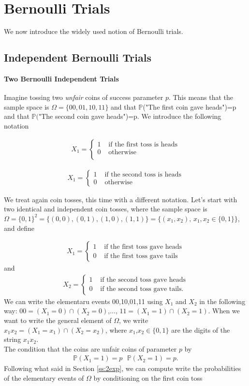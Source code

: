 \documentclass[12pt]{article}
\newcommand{\<}{{\langle \!\! \langle}}
\renewcommand{\>}{{\rangle \!\! \rangle}}
\newcommand{\bel}[2]{\begin{equation} \label{#1} \begin{split} #2
 					\end{split} \end{equation}}
\begin{document}
\section{ Bernoulli Trials} \label{s:bernoulli}

We now introduce the widely used notion of Bernoulli trials. 

\subsection{Independent Bernoulli Trials}

\paragraph{Two Bernoulli Independent Trials} 
Imagine tossing two \emph{unfair} coins of success parameter $p$. This means that the sample space is $\Omega = \{00,01,10,11\}$ and that $\mathbb{P}$("The first coin gave heads")=p and that $\mathbb{P}($"The second coin gave heads")=p. We introduce the following notation


\bel{d:x1}{
		 X_1 = \begin{cases}
			 1 &  \textrm{ if the first toss is heads}\\
		 	0 & \textrm{ otherwise }\\
		 \end{cases}}

	 \bel{d:x2}{
		 X_1 = \begin{cases}
			 1 &  \textrm{ if the second toss is heads}\\
		 	0 & \textrm{ otherwise }
		 \end{cases}}


We treat again coin tosses, this time with a different notation. Let's start with two identical and independent coin tosses, where the sample space is $\Omega=\{0,1\}^2=\{(0,0),(0,1),(1,0),(1,1)\}=\{(x_1,x_2), \,x_1,x_2\in\{0,1\}\}$, and define  


\bel{}{X_1=\begin{cases}
1 & \textrm{ if the first toss gave heads}\\
0 & \textrm{ if the first toss gave tails}
\end{cases}}
and
\bel{}{X_2=\begin{cases}
1 & \textrm{ if the second toss gave heads}\\
0 & \textrm{ if the second toss gave tails}.
\end{cases}}
We can write the elementaru events 00,10,01,11 using $X_1$ and $X_2$ in the following way: $00 = (X_1 = 0)\cap (X_2 = 0)$,..., $11 = (X_1 =1 ) \cap (X_2 = 1) $. When we want to write the general element of $\Omega$, we write $x_1x_2 = (X_1 = x_1) \cap (X_2 = x_2) $, where $x_1$,$x_2\in \{0,1\}$ are the digits of the string $x_1x_2$. \\
The condition that the coins are unfair coins of parameter $p$ by 
\bel{e:success2}{\mathbb{P}(X_1=1)=p\,\,\,\, \mathbb{P}(X_2 = 1) = p.}
Following what said in Section \ref{ss:2exp}, we can compute write the probabilities of the elementary events of $\Omega$ by conditioning on the first coin toss 
\end{document}
